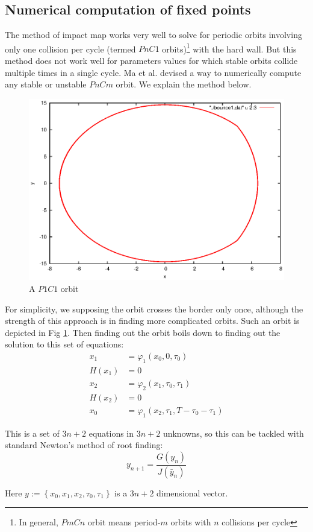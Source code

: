 \documentclass[oneside]{book}
\renewcommand{\(}{\begin{columns}}
\renewcommand{\)}{\end{columns}}
\newcommand{\<}[1]{\begin{column}{#1}}
\renewcommand{\>}{\end{column}}
\begin{document}
\subsection{Numerical computation of fixed points}
\label{subsec-num-comp}
The method of impact map works very well to solve for periodic orbits 
involving only one collision per cycle (termed $PnC1$ orbits)\footnote{In 
general, $PmCn$ orbit means period-$m$ orbits with $n$ collisions per cycle} with the hard wall.  But this method does not 
work well for parameters values for which stable orbits collide multiple times 
in a single cycle. Ma et al.\cite{ma-nraphson} devised a way to 
numerically compute any stable or unstable $PnCm$ orbit.  We explain the 
method below. 

\begin{figure}
\caption{A $P1C1$ orbit}
\label{fig-p1c1}
\begin{center}
\includegraphics[width=0.5\columnwidth]{p1c1}
\end{center}
\end{figure}

For simplicity, we supposing the orbit crosses the border only once, although 
the strength of this approach is in finding more complicated orbits.  Such an 
orbit is depicted in Fig \ref{fig-p1c1}.
Then finding out the orbit boils down to finding out the solution to this set 
of equations:
\begin{align}
x_1&=\varphi_1(x_0,0,\tau_0)\\
H(x_1)&=0\\
x_2&=\varphi_2(x_1,\tau_0,\tau_1)\\
H(x_2)&=0\\
x_0&=\varphi_1(x_2,\tau_1,T-\tau_0-\tau_1)
\end{align}


This is a set of $3n+2$ equations in $3n+2$ unknowns, so this can be tackled 
with standard Newton's method of root finding:
\[
y_{n+1}=\frac{G(y_n)}{J(\bar{y}_n)}
\]

Here $y:=\left\{x_0,x_1,x_2,\tau_0,\tau_1\right\}$ is a $3n+2$ dimensional 
vector.  
\end{document}
